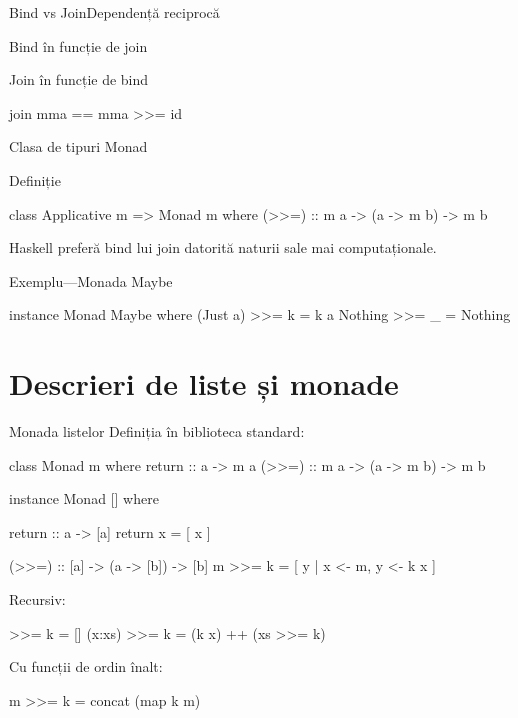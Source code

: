 \documentclass[xcolor=pdftex,romanian,colorlinks]{beamer}
\begin{document}
\begin{frame}[fragile]{Bind vs Join}{Dependență reciprocă}
\begin{block}{Bind în funcție de join}
\end{block}

\begin{block}{Join în funcție de bind}
\begin{asciihs}
   join mma == mma >>= id
\end{asciihs}
\end{block}

\end{frame}

\begin{frame}[fragile]{Clasa de tipuri Monad}
\begin{block}{Definiție}
\begin{asciihs}
class Applicative m => Monad m where
    (>>=)       :: m a -> (a -> m b) -> m b
\end{asciihs}
Haskell preferă bind lui join datorită naturii sale mai computaționale.
\end{block}
\begin{block}{Exemplu---Monada Maybe}
\begin{asciihs}

instance Monad Maybe where
    (Just a) >>= k = k a
    Nothing  >>= _ = Nothing
\end{asciihs}
\end{block}

\end{frame}

\section{Descrieri de liste și monade}

\begin{frame}[fragile]{Monada listelor}
Definiția în biblioteca standard:
\begin{asciihs}
     class Monad m where
       return :: a -> m a
       (>>=) :: m a -> (a -> m b) -> m b

     instance Monad [] where

       return       :: a -> [a]
       return x     = [ x ]

       (>>=)        :: [a] -> (a -> [b]) -> [b]
       m >>= k      = [ y | x <- m, y <- k x ]
\end{asciihs}
Recursiv:
\vspace{-1ex}
\begin{asciihs}
       [] >>= k            =   []
       (x:xs) >>= k        =   (k x) ++ (xs >>= k)
\end{asciihs}
Cu funcții de ordin înalt:
\vspace{-1ex}
\begin{asciihs}
       m >>= k    =   concat (map k m)
\end{asciihs}
\end{frame}
\end{document}
